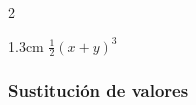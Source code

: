 \documentclass[12pt,examen,answers]{repaso_layout}
\begin{document}
\begin{questions}
{\begin{multicols}{2}
\begin{parts}
                \begin{solutionbox}{1.3cm}
                    $\frac{1}{2}(x+y)^3$
                \end{solutionbox}



            \end{parts}
        \end{multicols}
    }


     \subsubsection{Sustitución de valores}






\end{questions}
\end{document}
